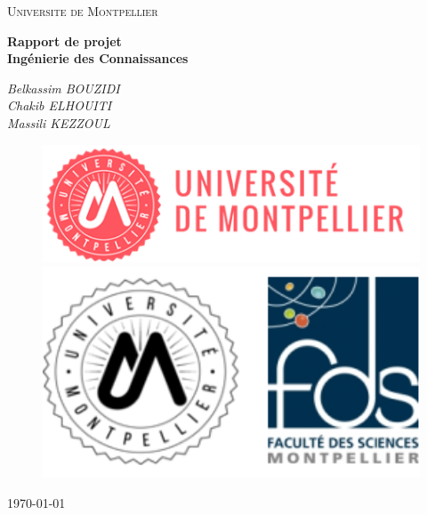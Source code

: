 \documentclass[oneside,13pt,a4paper]{article}
\title{}
\author{
    Chakib ELHOUITI \and
    Massili KEZZOUL \and
    Belkassim BOUZIDI
}
\date{\today}
\begin{document}
\begin{titlepage}
	\centering
	{\scshape\LARGE Universite de Montpellier\par}
	{\scshape\Large\par}
	\vspace{1.5cm}
	{\huge\bfseries Rapport de projet \\Ingénierie des Connaissances\par}
	\vspace{2cm}
	{\Large\itshape
    Belkassim BOUZIDI \\
		Chakib ELHOUITI \\
		Massili KEZZOUL \\
		\par}

		\vspace{2cm}

	\begin{figure}[h]
		\begin{minipage}[c]{.46\linewidth}
			\centering
			\includegraphics[width=1\textwidth]{img/univ-montpellier.png}
		\end{minipage}
		\hfill%
		\begin{minipage}[c]{.46\linewidth}
			\centering
			\includegraphics[width=1\textwidth]{img/fds.png}
		\end{minipage}
	\end{figure}

	\par\vspace{1cm}

	\vfill

	{\large \today\par}
\end{titlepage}
\end{document}
